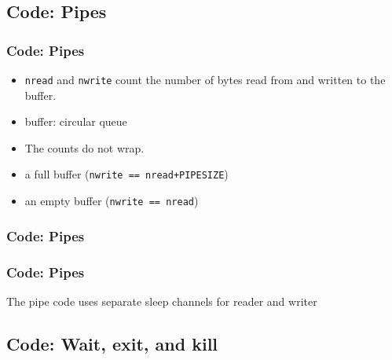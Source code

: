 \documentclass{beamer}
\begin{document}

\subsection{Code: Pipes}


\begin{frame}[t]
  \frametitle{Code: Pipes}

  

  \begin{itemize}
  \item \texttt{nread} and \texttt{nwrite} count the number of bytes read from and written
    to the buffer.
  \item buffer: circular queue
  \item The counts do not wrap. %
  \item a full buffer (\texttt{nwrite == nread+PIPESIZE})
  \item an empty buffer (\texttt{nwrite == nread})
  \end{itemize}
  
\end{frame}


\begin{frame}[t]
  \frametitle{Code: Pipes}

  
  
\end{frame}


\begin{frame}[t]
  \frametitle{Code: Pipes}

  
  
   The pipe code uses separate sleep channels for reader and writer
\end{frame}


\subsection{Code: Wait, exit, and kill}
\end{document}
